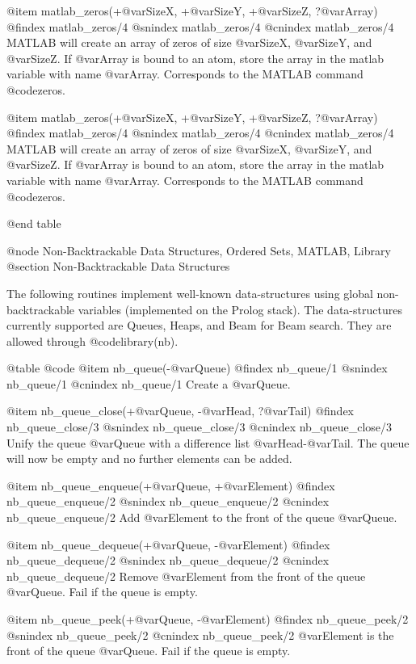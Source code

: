 {{{{{{{{{@item matlab_zeros(+@var{SizeX}, +@var{SizeY}, +@var{SizeZ}, ?@var{Array})
@findex matlab_zeros/4
@snindex matlab_zeros/4
@cnindex matlab_zeros/4
MATLAB will create an array of zeros of size @var{SizeX}, @var{SizeY},
and @var{SizeZ}. If @var{Array} is bound to an atom, store the array
in the matlab variable with name @var{Array}.  Corresponds to the
MATLAB command @code{zeros}.


@item matlab_zeros(+@var{SizeX}, +@var{SizeY}, +@var{SizeZ}, ?@var{Array})
@findex matlab_zeros/4
@snindex matlab_zeros/4
@cnindex matlab_zeros/4
MATLAB will create an array of zeros of size @var{SizeX}, @var{SizeY},
and @var{SizeZ}. If @var{Array} is bound to an atom, store the array
in the matlab variable with name @var{Array}.  Corresponds to the
MATLAB command @code{zeros}.




@end table

@node Non-Backtrackable Data Structures, Ordered Sets, MATLAB, Library
@section Non-Backtrackable Data Structures

The following routines implement well-known data-structures using global
non-backtrackable variables (implemented on the Prolog stack). The
data-structures currently supported are Queues, Heaps, and Beam for Beam
search. They are allowed through @code{library(nb)}. 

@table @code
@item nb_queue(-@var{Queue})
@findex nb_queue/1
@snindex nb_queue/1
@cnindex nb_queue/1
Create a @var{Queue}.

@item nb_queue_close(+@var{Queue}, -@var{Head}, ?@var{Tail})
@findex nb_queue_close/3
@snindex nb_queue_close/3
@cnindex nb_queue_close/3
Unify the queue  @var{Queue} with a difference list
@var{Head}-@var{Tail}. The queue will now be empty and no further
elements can be added.

@item nb_queue_enqueue(+@var{Queue}, +@var{Element})
@findex nb_queue_enqueue/2
@snindex nb_queue_enqueue/2
@cnindex nb_queue_enqueue/2
Add @var{Element} to the front of the queue  @var{Queue}.

@item nb_queue_dequeue(+@var{Queue}, -@var{Element})
@findex nb_queue_dequeue/2
@snindex nb_queue_dequeue/2
@cnindex nb_queue_dequeue/2
Remove @var{Element} from the front of the queue  @var{Queue}. Fail if
the queue is empty.

@item nb_queue_peek(+@var{Queue}, -@var{Element})
@findex nb_queue_peek/2
@snindex nb_queue_peek/2
@cnindex nb_queue_peek/2
@var{Element} is the front of the queue  @var{Queue}. Fail if
the queue is empty.

}}}}}}}}}
